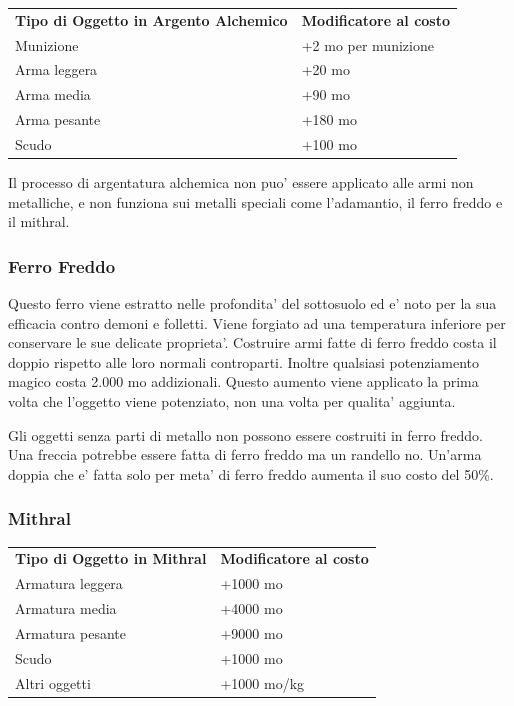 \documentclass[a4paper,11pt,twoside,openany]{book}
\begin{document}
{\label{argento-alchemico}

\begin{tabular}{ll}
\toprule
\textbf{Tipo di Oggetto in Argento Alchemico} & \textbf{Modificatore al costo}\tabularnewline
Munizione & +2 mo per munizione\tabularnewline
Arma leggera & +20 mo\tabularnewline
Arma media & +90 mo\tabularnewline
Arma pesante & +180 mo\tabularnewline
Scudo & +100 mo\tabularnewline
\end{tabular}

Il processo di argentatura alchemica non puo' essere applicato alle armi non metalliche, e non funziona sui metalli speciali come l'adamantio, il ferro freddo e il mithral.

\subsubsection{Ferro Freddo}

\label{ferro-freddo}

Questo ferro viene estratto nelle profondita' del sottosuolo ed e' noto per la sua efficacia contro demoni e folletti. Viene forgiato ad una temperatura inferiore per conservare le sue delicate proprieta'. Costruire armi fatte di ferro freddo costa il doppio rispetto alle loro normali controparti. Inoltre qualsiasi potenziamento magico costa 2.000 mo addizionali. Questo aumento viene applicato la prima volta che l'oggetto viene potenziato, non una volta per qualita' aggiunta. 

Gli oggetti senza parti di metallo non possono essere costruiti in ferro freddo. Una freccia potrebbe essere fatta di ferro freddo ma un randello no. Un'arma doppia che e' fatta solo per meta' di ferro freddo aumenta il suo costo del 50\%.

\subsubsection{Mithral}

\label{mithral}

\begin{tabular}{ll}
\toprule
\textbf{Tipo di Oggetto in Mithral} & \textbf{Modificatore al costo}\tabularnewline
Armatura leggera & +1000 mo\tabularnewline
Armatura media & +4000 mo\tabularnewline
Armatura pesante & +9000 mo\tabularnewline
Scudo & +1000 mo\tabularnewline
Altri oggetti & +1000 mo/kg\tabularnewline
\end{tabular}

\bigskip

}
\end{document}
